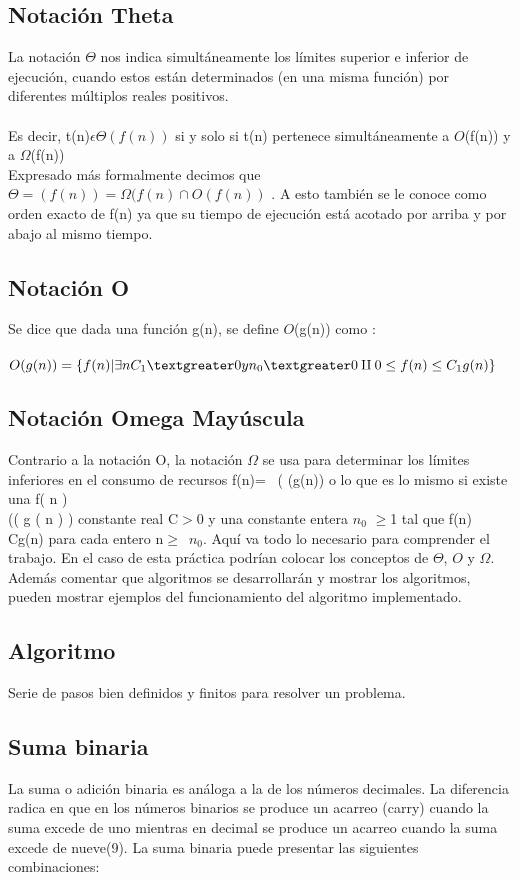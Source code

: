 \documentclass[12pt,twoside]{article}
\begin{document}
\subsection{Notación Theta}
La notación $ \Theta $ nos indica simultáneamente los límites
superior e inferior de ejecución, cuando estos están determinados
(en una misma función) por diferentes múltiplos reales positivos.\\
\\Es decir, t(n)$\epsilon \Theta(f(n))$ si y solo si t(n) pertenece
simultáneamente a $O$(f(n)) y a $\Omega$(f(n))
\\Expresado más formalmente decimos que $\Theta = (f(n)) = \Omega
(f(n) \cap O (f(n))$ . A esto también se le conoce como orden exacto
de f(n) ya que su tiempo de ejecución está acotado por arriba y por
abajo al mismo tiempo.

\subsection{Notación O}
Se dice que dada una función g(n), se define $O$(g(n)) como :
\\ \\$ O(g(n)) = \{f(n) | \exists n C_{1} \textgreater 0 y
n_{0} \textgreater 0 \amalg 0 \leq f(n) \leq C_{1}g(n)\} $

\subsection{Notación Omega Mayúscula}
Contrario a la notación O, la notación \(\Omega \) se usa para
determinar los límites inferiores en el consumo de recursos f(n)= \
(\Omega \) (g(n)) o lo que es lo mismo si existe una f( n ) \\
(\epsilon \Omega ( g ( n ) )\) constante real C\(>\)0 y una
constante entera $n_{0}$ \(\geq\)1 tal que f(n) \(\) Cg(n) para
cada entero n\(\geq\)\ $n_{0} $.
Aqu\'i va todo lo necesario para comprender el trabajo. En el caso de esta pr\'actica podr\'ian
colocar los conceptos de $\Theta$, $O$ y $\Omega$. Adem\'as comentar que algoritmos se
desarrollar\'an y mostrar los algoritmos, pueden mostrar ejemplos del funcionamiento del
algoritmo implementado.

\subsection{Algoritmo}
Serie de pasos bien definidos y finitos para resolver un problema.

\subsection{Suma binaria}
La suma o adición binaria es análoga a la de los números decimales. La diferencia radica en que en los números binarios se produce un acarreo (carry) cuando la suma excede de uno mientras en decimal se produce un acarreo cuando la suma excede de nueve(9). La suma binaria puede presentar las siguientes combinaciones:
\end{document}
